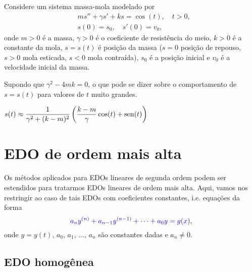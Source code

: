 \begin{exer}
  Considere um sistema massa-mola modelado por
  \begin{align}
    & ms'' + \gamma s' + ks = \cos(t),\quad t>0,\\
    & s(0) = s_0,\quad s'(0) = v_0,
  \end{align}
  onde $m>0$ é a massa, $\gamma>0$ é o coeficiente de resistência do meio, $k>0$ é a constante da mola, $s=s(t)$ é posição da massa ($s=0$ posição de repouso, $s>0$ mola esticada, $s<0$ mola contraída), $s_0$ é a posição inicial e $v_0$ é a velocidade inicial da massa.

  Supondo que $\gamma^2-4mk = 0$, o que pode se dizer sobre o comportamento de $s=s(t)$ para valores de $t$ muito grandes. 
\end{exer}
\begin{resp}
  $s(t) \approx \displaystyle \frac{1}{\gamma^2 + (k-m)^2}\left(\frac{k-m}{\gamma}\cos(t) + \operatorname{sen}(t)\right)$
\end{resp}

\section{EDO de ordem mais alta}\label{cap_edolin_sec_edon}

Os métodos aplicados para EDOs lineares de segunda ordem podem ser estendidos para tratarmos EDOs lineares de ordem mais alta. Aqui, vamos nos restringir ao caso de tais EDOs com coeficientes constantes, i.e. equações da forma
\begin{equation}
  {\color{blue}a_ny^{(n)} + a_{n-1}y^{(n-1)} + \cdots + a_0y = g(x)},
\end{equation}
onde $y = y(t)$, $a_0$, $a_1$, $\dotsc$, $a_{n}$ são constantes dadas e $a_n\neq 0$.

\subsection{EDO homogênea}

